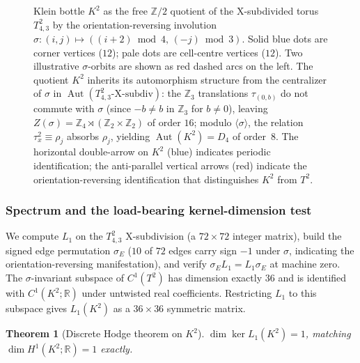 \documentclass[12pt,a4paper]{article}
\newtheorem{theorem}{Theorem}[section]
\theoremstyle{definition}
\theoremstyle{remark}
\newcommand{\bZ}{\mathbb{Z}}
\newcommand{\bR}{\mathbb{R}}
\DeclareMathOperator{\Aut}{Aut}
\begin{document}
\begin{figure}[H]
\caption{Klein bottle $K^2$ as the free $\bZ/2$ quotient of the
X-subdivided torus $T^2_{4,3}$ by the orientation-reversing involution
$\sigma\colon (i, j) \mapsto ((i{+}2) \bmod 4,\, ({-}j) \bmod 3)$. Solid
blue dots are corner vertices ($12$); pale dots are cell-centre vertices
($12$). Two illustrative $\sigma$-orbits are shown as red dashed arcs
on the left. The quotient $K^2$ inherits its automorphism structure
from the centralizer of $\sigma$ in $\Aut(T^2_{4,3} \text{-X-subdiv})$:
the $\bZ_3$ translations $\tau_{(0, b)}$ do not commute with $\sigma$
(since $-b \neq b$ in $\bZ_3$ for $b \neq 0$), leaving
$Z(\sigma) = \bZ_4 \rtimes (\bZ_2 \times \bZ_2)$ of order $16$; modulo
$\langle \sigma \rangle$, the relation $\tau_x^2 \equiv \rho_j$ absorbs
$\rho_j$, yielding $\Aut(K^2) = D_4$ of order~$8$. The horizontal
double-arrow on $K^2$ (blue) indicates periodic identification; the
anti-parallel vertical arrows (red) indicate the orientation-reversing
identification that distinguishes $K^2$ from $T^2$.}
\label{fig:klein-quotient}
\end{figure}

\subsubsection{Spectrum and the load-bearing kernel-dimension test}\label{sec:klein-spectrum}

We compute $L_1$ on the $T^2_{4,3}$ X-subdivision (a $72 \times 72$
integer matrix), build the signed edge permutation $\sigma_E$
($10$ of $72$ edges carry sign $-1$ under $\sigma$, indicating the
orientation-reversing manifestation), and verify
$\sigma_E L_1 = L_1 \sigma_E$ at machine zero. The
$\sigma$-invariant subspace of $C^1(T^2)$ has dimension exactly $36$
and is identified with $C^1(K^2; \bR)$ under untwisted real
coefficients. Restricting $L_1$ to this subspace gives
$L_1(K^2)$ as a $36 \times 36$ symmetric matrix.

\begin{theorem}[Discrete Hodge theorem on $K^2$]\label{thm:klein-hodge}
$\dim \ker L_1(K^2) = 1$, matching $\dim H^1(K^2; \bR) = 1$ exactly.
\end{theorem}
\end{document}
